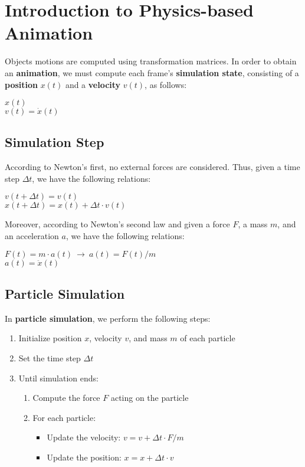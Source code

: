 \documentclass{article}
\begin{document}
\newpage

\section{Introduction to Physics-based Animation}
Objects motions are computed using transformation matrices. In order to obtain an \textbf{animation}, we must compute each frame's \textbf{simulation state}, consisting of a \textbf{position} $x(t)$ and a \textbf{velocity} $v(t)$, as follows: 
\begin{center}
    $x(t)$ \\
    $v(t) = \dot{x}(t)$
\end{center}
\subsection{Simulation Step}
According to Newton's first, no external forces are considered. Thus, given a time step $\Delta t$, we have the following relations:
\begin{center}
    $ v(t + \Delta t) = v(t)$ \\
    $ x(t + \Delta t) = x(t) + \Delta t \cdot v(t) $
\end{center}
Moreover, according to Newton's second law and given a force $F$, a mass $m$, and an acceleration $a$, we have the following relations:
\begin{center}
    $ F(t) = m \cdot a(t) \ \rightarrow \ a(t) = F(t) / m $ \\
    $a(t) = \ddot{x}(t)$
\end{center}
\subsection{Particle Simulation}
In \textbf{particle simulation}, we perform the following steps:
\begin{enumerate}
    \item Initialize position $x$, velocity $v$, and mass $m$ of each particle
    \item Set the time step $\Delta t$
    \item Until simulation ends:
        \begin{enumerate}
            \item Compute the force $F$ acting on the particle
            \item For each particle:
                \begin{itemize}
                    \item Update the velocity: $v = v + \Delta t \cdot F / m$
                    \item Update the position: $x = x + \Delta t \cdot v$
                \end{itemize}
        \end{enumerate}
\end{enumerate}
\newpage
\end{document}
